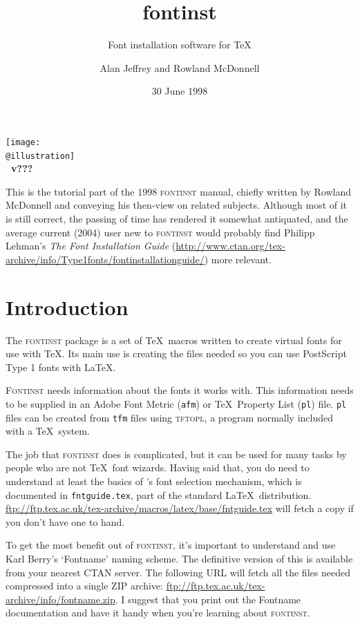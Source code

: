 \documentclass[a4paper]{ltxguide}
\title{fontinst}
\subtitle{Font installation software for \TeX}
\author{Alan Jeffrey and Rowland McDonnell}
\date{30 June 1998}
\makeatletter
\newcommand{\@subtitle}{}
\newcommand{\@version}{???}
\newcommand{\@illustration}{cover.eps}
\renewcommand{\maketitle}{{%
   \thispagestyle{empty}%
   \normalfont\centering
   \null
   {\fontsize{100}{100}\textit{\@title}}%
   \par\bigskip
   {\Large\textbf{\@subtitle}}%
   \vfill
   \texttt{[image: \\@illustration]}%
   \vfill
   {\Large\textbf{%
      \@author\\[\smallskipamount] \@title~v\@version
      \quad\textperiodcentered\quad \@date}}%
   \clearpage
}}
\newcommand*{\setfilename}[1]{\texttt{#1}}
\newcommand*{\setpackagename}[1]{\textsc{#1}}
\newcommand{\fontinst}{\setpackagename{font\-inst}\xspace}
\newcommand{\Fontinst}{\setpackagename{Font\-inst}\xspace}
\newcommand{\Fontnamekb}{Fontname\xspace}
\newcommand{\pl} {\setfilename{pl}\xspace}
\newcommand{\afm}{\setfilename{afm}\xspace}
\newcommand{\tfm}{\setfilename{tfm}\xspace}
\newcommand{\tftopl}{\setpackagename{tftopl}\xspace}
\makeatother
\begin{document}
\maketitle


\begin{small}
  This is the tutorial part of the 1998 \fontinst manual, chiefly 
  written by Rowland McDonnell and conveying his then-view on related 
  subjects. Although most of it is still correct, 
  the passing of time has rendered it somewhat antiquated, and the 
  average current (2004) user new to \fontinst would probably find 
  Philipp Lehman's \emph{The Font Installation Guide} 
  (\url{http://www.ctan.org/tex-archive/info/Type1fonts/fontinstallationguide/})
  more relevant.
\end{small}

\tableofcontents


\clearpage

\section{Introduction}

The \fontinst package is a set of \TeX\ macros written to create
virtual fonts for use with \TeX. Its main use is creating the
files needed so you can use PostScript Type 1 fonts with \LaTeX.

\Fontinst needs information about the fonts it works with.  This
information needs to be supplied in an Adobe Font Metric (\afm) or
\TeX\ Property List (\pl) file.  \pl files can be created from
\tfm files using \tftopl, a program normally included with a \TeX\
system.

The job that \fontinst does is complicated, but it can be used for
many tasks by people who are not \TeX\ font wizards.  Having said
that, you do need to understand at least the basics of \LaTeXe's
font selection mechanism, which is documented in
\texttt{fntguide.tex}, part of the standard \LaTeX\ distribution.
\url{ftp://ftp.tex.ac.uk/tex-archive/macros/latex/base/fntguide.tex}
will fetch a copy if you don't have one to hand.

To get the most benefit out of \fontinst, it's important to
understand and use Karl Berry's `\Fontnamekb' naming scheme.  The
definitive version of this is available from your nearest CTAN
server.  The following URL will fetch all the files needed
compressed into a single ZIP archive:
\url{ftp://ftp.tex.ac.uk/tex-archive/info/fontname.zip}.  I
suggest that you print out the \Fontnamekb documentation and have
it handy when you're learning about \fontinst.
\end{document}
